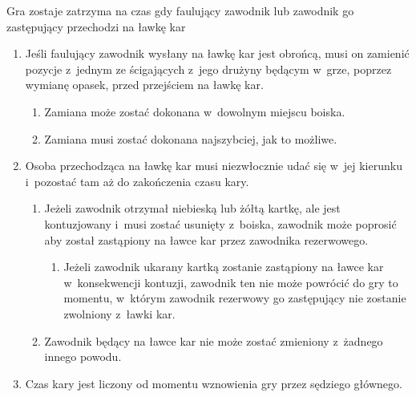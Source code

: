 \documentclass[12pt,a4paper]{article}
\renewcommand{\paragraph}[1]{
  \oldparagraph{#1}%
  \leftskip2cm
}
\begin{document}
\paragraph{Przejście na ławkę kar}
Gra zostaje zatrzyma na czas
gdy faulujący zawodnik lub zawodnik go zastępujący przechodzi na ławkę
kar

\begin{enumerate}
	\item
	      Jeśli faulujący zawodnik wysłany na ławkę kar jest obrońcą, musi on
	      zamienić pozycje z~jednym ze ścigających z~jego drużyny będącym w~grze, poprzez wymianę opasek, przed przejściem na ławkę kar.

	      \begin{enumerate}
		      \item
		            Zamiana może zostać dokonana w~dowolnym miejscu boiska.
		      \item
		            Zamiana musi zostać dokonana najszybciej, jak to możliwe.
	      \end{enumerate}
	\item
	      Osoba przechodząca na ławkę kar musi niezwłocznie udać się w~jej
	      kierunku i~pozostać tam aż do zakończenia czasu kary.

	      \begin{enumerate}
		      \item
		            Jeżeli zawodnik otrzymał niebieską lub żółtą kartkę, ale jest
		            kontuzjowany i~musi zostać usunięty z~boiska, zawodnik może poprosić
		            aby został zastąpiony na ławce kar przez zawodnika rezerwowego.

		            \begin{enumerate}
			            \item
			                  Jeżeli zawodnik ukarany kartką zostanie zastąpiony na ławce kar w~konsekwencji kontuzji, zawodnik ten nie może powrócić do gry to
			                  momentu, w~którym zawodnik rezerwowy go zastępujący nie zostanie
			                  zwolniony z~ławki kar.
		            \end{enumerate}
		      \item
		            Zawodnik będący na ławce kar nie może zostać zmieniony z~żadnego
		            innego powodu.
	      \end{enumerate}
	\item
	      Czas kary jest liczony od momentu wznowienia gry przez sędziego
	      głównego.
\end{enumerate}
\end{document}
